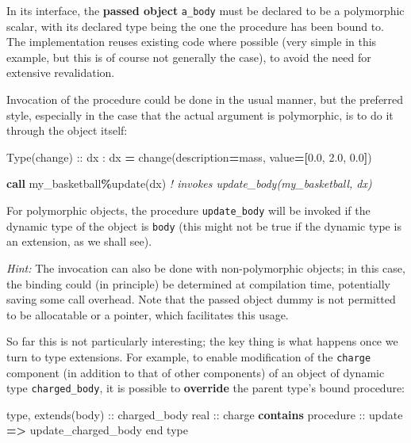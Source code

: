 \documentclass[
  paper=a4,
  ,captions=tableheading
]{scrartcl}
\newenvironment{Shaded}{\begin{snugshade}}{\end{snugshade}}
\newcommand{\CommentTok}[1]{\textcolor[rgb]{0.56,0.35,0.01}{\textit{#1}}}
\newcommand{\DataTypeTok}[1]{\textcolor[rgb]{0.13,0.29,0.53}{#1}}
\newcommand{\FloatTok}[1]{\textcolor[rgb]{0.00,0.00,0.81}{#1}}
\newcommand{\KeywordTok}[1]{\textcolor[rgb]{0.13,0.29,0.53}{\textbf{#1}}}
\newcommand{\NormalTok}[1]{#1}
\newcommand{\OperatorTok}[1]{\textcolor[rgb]{0.81,0.36,0.00}{\textbf{#1}}}
\newcommand{\StringTok}[1]{\textcolor[rgb]{0.31,0.60,0.02}{#1}}
\begin{document}
In its interface, the \textbf{passed object} \texttt{a\_body} must be
declared to be a polymorphic scalar, with its declared type being the
one the procedure has been bound to. The implementation reuses existing
code where possible (very simple in this example, but this is of course
not generally the case), to avoid the need for extensive revalidation.

Invocation of the procedure could be done in the usual manner, but the
preferred style, especially in the case that the actual argument is
polymorphic, is to do it through the object itself:

\begin{Shaded}
\begin{Highlighting}[]
\DataTypeTok{Type(change)} \DataTypeTok{::}\NormalTok{  dx}
\NormalTok{:}
\NormalTok{dx }\KeywordTok{=}\NormalTok{ change(description}\KeywordTok{=}\StringTok{\textquotesingle{}mass\textquotesingle{}}\NormalTok{, }\DataTypeTok{value}\KeywordTok{=[}\FloatTok{0.0}\NormalTok{, }\FloatTok{2.0}\NormalTok{, }\FloatTok{0.0}\KeywordTok{]}\NormalTok{)}

\KeywordTok{call}\NormalTok{ my\_basketball}\OperatorTok{\%}\NormalTok{update(dx) }\CommentTok{! invokes update\_body(my\_basketball, dx)}
\end{Highlighting}
\end{Shaded}

For polymorphic objects, the procedure \texttt{update\_body} will be
invoked if the dynamic type of the object is \texttt{body} (this might
not be true if the dynamic type is an extension, as we shall see).

\emph{Hint:} The invocation can also be done with non-polymorphic
objects; in this case, the binding could (in principle) be determined at
compilation time, potentially saving some call overhead. Note that the
passed object dummy is not permitted to be allocatable or a pointer,
which facilitates this usage.

So far this is not particularly interesting; the key thing is what
happens once we turn to type extensions. For example, to enable
modification of the \texttt{charge} component (in addition to that of
other components) of an object of dynamic type \texttt{charged\_body},
it is possible to \textbf{override} the parent type's bound procedure:

\begin{Shaded}
\begin{Highlighting}[]
\DataTypeTok{type}\NormalTok{, }\DataTypeTok{extends(body)} \DataTypeTok{::}\NormalTok{ charged\_body}
  \DataTypeTok{real} \DataTypeTok{::}\NormalTok{ charge}
\KeywordTok{contains}
  \DataTypeTok{procedure} \DataTypeTok{::}\NormalTok{ update }\KeywordTok{=}\OperatorTok{\textgreater{}}\NormalTok{ update\_charged\_body}
\DataTypeTok{end type}
\end{Highlighting}
\end{Shaded}
\end{document}
